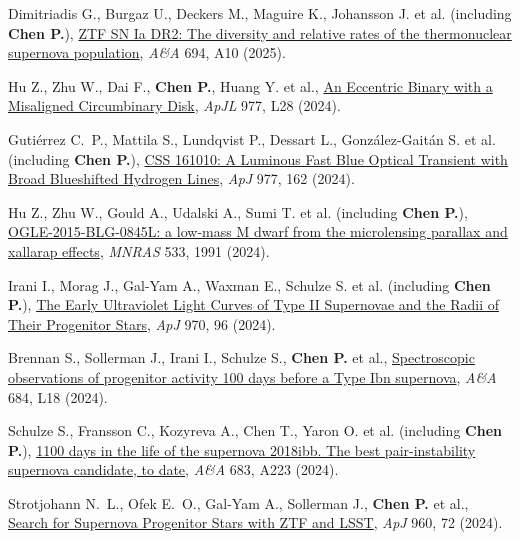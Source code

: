 \item Dimitriadis G., Burgaz U., Deckers M., Maguire K., Johansson J. et al. (including \textbf{Chen P.}), \href{https://ui.adsabs.harvard.edu/abs/2025A&A...694A..10D}{ZTF SN Ia DR2: The diversity and relative rates of the thermonuclear supernova population}, \textit{A\&A} 694, A10 (2025).

\item Hu Z., Zhu W., Dai F., \textbf{Chen P.}, Huang Y. et al., \href{https://ui.adsabs.harvard.edu/abs/2024ApJ...977L..28H}{An Eccentric Binary with a Misaligned Circumbinary Disk}, \textit{ApJL} 977, L28 (2024).

\item Guti{\'e}rrez C.~P., Mattila S., Lundqvist P., Dessart L., Gonz{\'a}lez-Gait{\'a}n S. et al. (including \textbf{Chen P.}), \href{https://ui.adsabs.harvard.edu/abs/2024ApJ...977..162G}{CSS 161010: A Luminous Fast Blue Optical Transient with Broad Blueshifted Hydrogen Lines}, \textit{ApJ} 977, 162 (2024).

\item Hu Z., Zhu W., Gould A., Udalski A., Sumi T. et al. (including \textbf{Chen P.}), \href{https://ui.adsabs.harvard.edu/abs/2024MNRAS.533.1991H}{OGLE-2015-BLG-0845L: a low-mass M dwarf from the microlensing parallax and xallarap effects}, \textit{MNRAS} 533, 1991 (2024).

\item Irani I., Morag J., Gal-Yam A., Waxman E., Schulze S. et al. (including \textbf{Chen P.}), \href{https://ui.adsabs.harvard.edu/abs/2024ApJ...970...96I}{The Early Ultraviolet Light Curves of Type II Supernovae and the Radii of Their Progenitor Stars}, \textit{ApJ} 970, 96 (2024).

\item Brennan S., Sollerman J., Irani I., Schulze S., \textbf{Chen P.} et al., \href{https://ui.adsabs.harvard.edu/abs/2024A&A...684L..18B}{Spectroscopic observations of progenitor activity 100 days before a Type Ibn supernova}, \textit{A\&A} 684, L18 (2024).

\item Schulze S., Fransson C., Kozyreva A., Chen T., Yaron O. et al. (including \textbf{Chen P.}), \href{https://ui.adsabs.harvard.edu/abs/2024A&A...683A.223S}{1100 days in the life of the supernova 2018ibb. The best pair-instability supernova candidate, to date}, \textit{A\&A} 683, A223 (2024).

\item Strotjohann N.~L., Ofek E.~O., Gal-Yam A., Sollerman J., \textbf{Chen P.} et al., \href{https://ui.adsabs.harvard.edu/abs/2024ApJ...960...72S}{Search for Supernova Progenitor Stars with ZTF and LSST}, \textit{ApJ} 960, 72 (2024).

